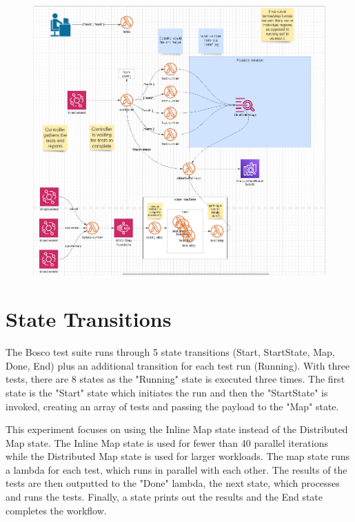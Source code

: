 \documentclass[12pt,a4paper,titlepage]{report}
\begin{document}
\begin{figure}[h]
  \centering
  \includegraphics[width=15cm]{./diagrams/possible_implementation}
\end{figure}

\section{State Transitions}

The Bosco test suite runs through 5 state transitions (Start, StartState, Map, Done, End) plus an additional transition for each test run (Running). With three tests, there are 8 states as the "Running" state is executed three times. The first state is the "Start" state which initiates the run and then the "StartState" is invoked, creating an array of tests and passing the payload to the "Map" state.

This experiment focuses on using the Inline Map state instead of the Distributed Map state. The Inline Map state is used for fewer than 40 parallel iterations while the Distributed Map state is used for larger workloads. The map state runs a lambda for each test, which runs in parallel with each other. The results of the tests are then outputted to the "Done" lambda, the next state, which processes and runs the tests. Finally, a state prints out the results and the End state completes the workflow.
\end{document}
